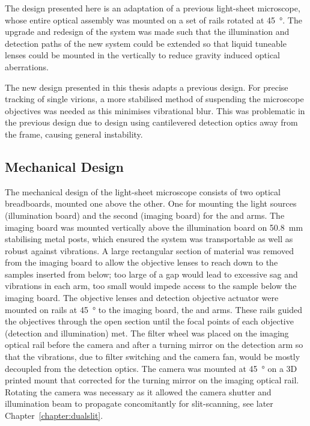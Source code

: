 The design presented here is an adaptation of a previous \gls{light-sheet} microscope, whose entire optical assembly was mounted on a set of rails rotated at \SI{45}{\degree}.
The upgrade and redesign of the system was made such that the illumination and detection paths of the new system could be extended so that liquid tuneable lenses could be mounted in the vertically to reduce gravity induced optical aberrations.

The new design presented in this thesis adapts a previous design.
For precise tracking of single virions, a more stabilised method of suspending the microscope objectives was needed as this minimises vibrational blur.
This was problematic in the previous design due to design using cantilevered detection optics away from the frame, causing general instability.

\subsection{Mechanical Design}


The mechanical design of the \gls{light-sheet} microscope consists of two optical breadboards, mounted one above the other.
One for mounting the light sources (\gls{illumination board}) and the second (\gls{imaging board}) for the  and  arms.
The \gls{imaging board} was mounted vertically above the \gls{illumination board} on \SI{50.8}{\milli\metre} stabilising metal posts, which ensured the system was transportable as well as robust against vibrations.
A large rectangular section of material was removed from the \gls{imaging board} to allow the objective lenses to reach down to the samples inserted from below; too large of a gap would lead to excessive sag and vibrations in each arm, too small would impede access to the sample below the imaging board.
The objective lenses and detection objective actuator were mounted on rails at \SI{45}{\degree} to the \gls{imaging board}, the  and  arms.
These rails guided the objectives through the open section until the focal points of each objective (detection and illumination) met.
The filter wheel was placed on the \gls{imaging optical rail} before the camera and after a turning mirror on the \gls{detection arm}
so that the vibrations, due to
filter switching and the camera fan, would be mostly decoupled from the detection optics.
The camera was mounted at \SI{45}{\degree} on a \gls{3D} printed mount that corrected for the turning mirror on the \gls{imaging optical rail}.
Rotating the camera was necessary as it allowed the camera shutter and illumination beam to propagate concomitantly for slit-scanning, see later Chapter~\ref{chapter:dualslit}.

